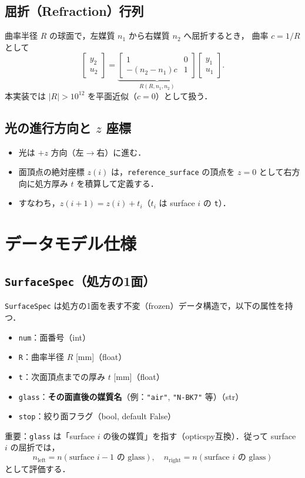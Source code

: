 \documentclass[a4paper,11pt]{jsarticle} %
\begin{document}
\subsection{屈折（Refraction）行列}
曲率半径 $R$ の球面で，左媒質 $n_1$ から右媒質 $n_2$ へ屈折するとき，
曲率 $c=1/R$ として
\[
\begin{bmatrix}y_2\\u_2\end{bmatrix}=
\underbrace{\begin{bmatrix}1&0\\-(n_2-n_1)c&1\end{bmatrix}}_{R(R,n_1,n_2)}
\begin{bmatrix}y_1\\u_1\end{bmatrix}.
\]
本実装では $|R|>10^{12}$ を平面近似（$c=0$）として扱う．

\subsection{光の進行方向と $z$ 座標}
\begin{itemize}
  \item 光は $+z$ 方向（左$\rightarrow$右）に進む．
  \item 面頂点の絶対座標 $z(i)$ は，\texttt{reference\_surface} の頂点を $z=0$ として右方向に処方厚み $t$ を積算して定義する．
  \item すなわち，$z(i+1)=z(i)+t_i$（$t_i$ は surface $i$ の \texttt{t}）．
\end{itemize}

\section{データモデル仕様}
\subsection{\texttt{SurfaceSpec}（処方の1面）}
\texttt{SurfaceSpec} は処方の1面を表す不変（frozen）データ構造で，以下の属性を持つ．
\begin{itemize}
  \item \texttt{num}：面番号（int）
  \item \texttt{R}：曲率半径 $R$ [mm]（float）
  \item \texttt{t}：次面頂点までの厚み $t$ [mm]（float）
  \item \texttt{glass}：\textbf{その面直後の媒質名}（例：\texttt{"air"}, \texttt{"N-BK7"} 等）（str）
  \item \texttt{stop}：絞り面フラグ（bool, default False）
\end{itemize}
重要：\texttt{glass} は「surface $i$ の後の媒質」を指す（opticspy互換）．従って surface $i$ の屈折では，
\[
n_{\text{left}}=n(\text{surface }i-1\text{ の glass}),\quad
n_{\text{right}}=n(\text{surface }i\text{ の glass})
\]
として評価する．
\end{document}
